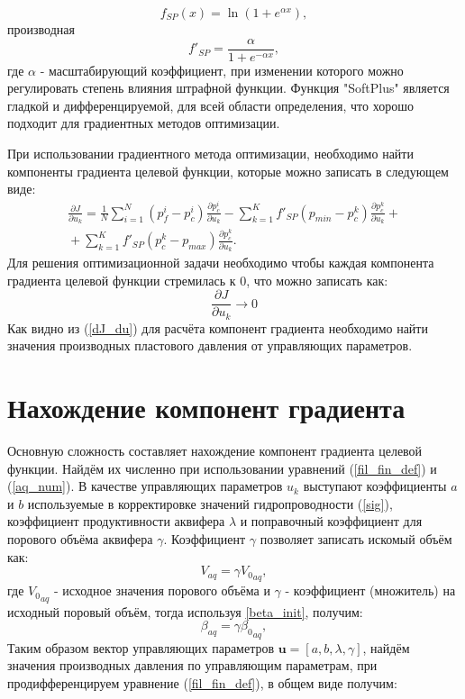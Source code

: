 \documentclass[14pt]{article}
\begin{document}
\begin{equation} \label{SP}
f_{SP}(x) = \ln\left(1+e^{\alpha x}\right),
\end{equation}
производная 
\begin{equation} \label{dSP}
f'_{SP} = \frac{\alpha}{1+e^{-\alpha x}},
\end{equation}
где $ \alpha $ - масштабирующий коэффициент, при изменении которого можно регулировать степень влияния штрафной функции. Функция "SoftPlus" является гладкой и дифференцируемой, для всей области определения, что хорошо подходит для градиентных методов оптимизации. 

При использовании градиентного метода оптимизации, необходимо найти компоненты градиента целевой функции, которые можно записать в следующем виде:
\begin{multline}\label{dJ_du}
	\frac{\partial J}{\partial u_k} = \frac{1}{N}\sum_{i=1}^N \left(p_f^i-p_c^i\right)\frac{\partial p_c^i}{\partial u_k} - \sum_{k=1}^K{f'_{SP}(p_{min} - p^k_c)\frac{\partial p_c^k}{\partial u_k}} + {} \\ {}
	 + \sum_{k=1}^K{f'_{SP}(p^k_c-p_{max})\frac{\partial p_c^k}{\partial u_k}}.
\end{multline}
Для решения оптимизационной задачи необходимо чтобы каждая компонента градиента целевой функции стремилась к 0, что можно записать как:
\begin{equation} \label{dJ_du0}
\frac{\partial J}{\partial u_k} \rightarrow 0
\end{equation}
Как видно из (\ref{dJ_du}) для расчёта компонент градиента необходимо найти значения производных пластового давления от управляющих параметров.

\section{Нахождение компонент градиента}
Основную сложность составляет нахождение компонент градиента целевой функции. Найдём их численно при использовании уравнений (\ref{fil_fin_def}) и (\ref{aq_num}). В качестве управляющих параметров $ u_k $ выступают коэффициенты $ a $ и $ b $ используемые в корректировке значений гидропроводности   (\ref{sig}), коэффициент продуктивности аквифера $ \lambda $ и поправочный коэффициент для порового объёма аквифера $ \gamma $. Коэффициент $ \gamma $ позволяет записать искомый объём как:
\begin{equation*} \label{gamma_init}
V_{aq} = \gamma{V_0}_{aq},
\end{equation*}
 где $ {V_0}_{aq}$ -  исходное значения порового объёма и $ \gamma $ - коэффициент (множитель) на исходный поровый объём, тогда используя {\ref{beta_init}}, получим:
 \begin{equation} \label{beta_gamma}
 \beta_{aq} = \gamma {\beta_0}_{aq},
 \end{equation}
  Таким образом вектор управляющих параметров $ \boldsymbol{u} = [a,b,\lambda,\gamma]$, найдём значения производных давления по управляющим параметрам, при продифференцируем уравнение (\ref{fil_fin_def}), в общем виде получим:
\end{document}

